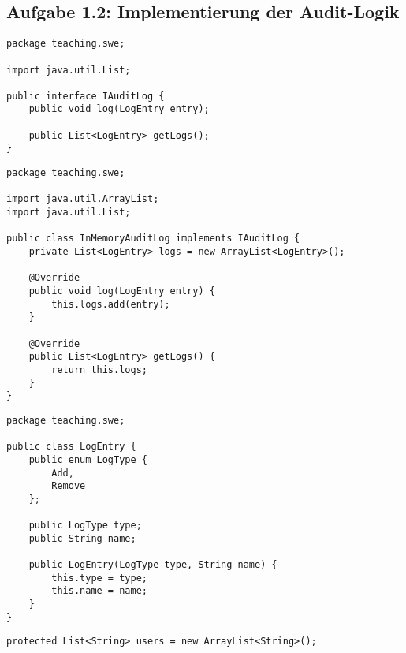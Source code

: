 \subsection*{Aufgabe 1.2: Implementierung der Audit-Logik}

\begin{lstlisting}[style=javastyle, caption=IAuditLog]
package teaching.swe;

import java.util.List;

public interface IAuditLog {
    public void log(LogEntry entry);

    public List<LogEntry> getLogs();
}
\end{lstlisting}

\begin{lstlisting}[style=javastyle, caption=InMemoryAuditLog]
package teaching.swe;

import java.util.ArrayList;
import java.util.List;

public class InMemoryAuditLog implements IAuditLog {
    private List<LogEntry> logs = new ArrayList<LogEntry>();

    @Override
    public void log(LogEntry entry) {
        this.logs.add(entry);
    }

    @Override
    public List<LogEntry> getLogs() {
        return this.logs;
    }
}
\end{lstlisting}

\begin{lstlisting}[style=javastyle, caption={LogEntry}]
package teaching.swe;

public class LogEntry {
    public enum LogType {
        Add,
        Remove
    };

    public LogType type;
    public String name;

    public LogEntry(LogType type, String name) {
        this.type = type;
        this.name = name;
    }
}
\end{lstlisting}

\begin{lstlisting}[style=javastyle, caption={Änderung SimpleUserManager, damit UserManagerWithAudit Zugang zum Member users hat}]
protected List<String> users = new ArrayList<String>();
\end{lstlisting}


